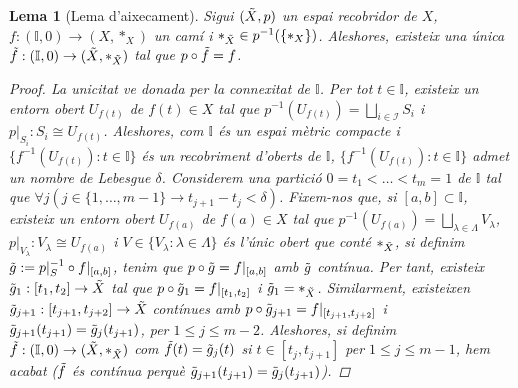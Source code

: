 \documentclass[compress,10pt]{article}
\newtheorem{lema}{Lema}[section]
\theoremstyle{definition}
\begin{document}
\begin{lema}[Lema d'aixecament]
    Sigui $(\Tilde{X},p)$ un espai recobridor de $X$, $f:(\mathbb{I},0)\rightarrow(X,*_{X})$ un camí i $*_{\Tilde{X}}\in p^{-1}(\{*_{X}\})$. Aleshores, existeix una única $\Tilde{f}:(\mathbb{I},0)\rightarrow(\Tilde{X},*_{\Tilde{X}})$ tal que $p\circ\Tilde{f}=f$.
    \begin{center}
    \end{center}
    \begin{proof}
        La unicitat ve donada per la connexitat de $\mathbb{I}$.\newline
        Per tot $t\in\mathbb{I}$, existeix un entorn obert $U_{f(t)}$ de $f(t)\in X$ tal que $p^{-1}(U_{f(t)})=\bigsqcup_{i\in\mathscr{I}}S_{i}$ i $p|_{S_{i}}:S_{i}\cong U_{f(t)}$. Aleshores, com $\mathbb{I}$ és un espai mètric compacte i $\{f^{-1}(U_{f(t)}):t\in\mathbb{I}\}$ és un recobriment d'oberts de $\mathbb{I}$, $\{f^{-1}(U_{f(t)}):t\in\mathbb{I}\}$ admet un nombre de Lebesgue $\delta$. Considerem una partició $0=t_{1}<\ldots<t_{m}=1$ de $\mathbb{I}$ tal que $\forall j(j\in\{1,\ldots,m-1\}\rightarrow t_{j+1}-t_{j}<\delta)$.\newline
        Fixem-nos que, si $[a,b]\subset\mathbb{I}$, existeix un entorn obert $U_{f(a)}$ de $f(a)\in X$ tal que $p^{-1}(U_{f(a)})=\bigsqcup_{\lambda\in\Lambda}V_{\lambda}$, $p|_{V_{\lambda}}:V_{\lambda}\cong U_{f(a)}$ i $V\in\{V_{\lambda}:\lambda\in\Lambda\}$ és l'únic obert que conté $*_{\Tilde{X}}$, si definim $\Tilde{g}:=p|_{S}^{-1}\circ f|_{[a,b]}$, tenim que $p\circ\Tilde{g}=f|_{[a,b]}$ amb $\Tilde{g}$ contínua. Per tant, existeix $\Tilde{g}_{1}:[t_{1},t_{2}]\rightarrow\Tilde{X}$ tal que $p\circ\Tilde{g}_{1}=f|_{[t_{1},t_{2}]}$ i $\Tilde{g}_{1}=*_{\Tilde{X}}$. Similarment, existeixen $\Tilde{g}_{j+1}:[t_{j+1},t_{j+2}]\rightarrow\Tilde{X}$ contínues amb $p\circ\Tilde{g}_{j+1}=f|_{[t_{j+1},t_{j+2}]}$ i $\Tilde{g}_{j+1}(t_{j+1})=\Tilde{g}_{j}(t_{j+1})$, per $1\leq j\leq m-2$. Aleshores, si definim $\Tilde{f}:(\mathbb{I},0)\rightarrow(\Tilde{X},*_{\Tilde{X}})$ com $\Tilde{f}(t)=\Tilde{g}_{j}(t)$ si $t\in[t_{j},t_{j+1}]$ per $1\leq j\leq m-1$, hem acabat ($\Tilde{f}$ és contínua perquè $\Tilde{g}_{j+1}(t_{j+1})=\Tilde{g}_{j}(t_{j+1})$).
    \end{proof}
\end{lema}
\end{document}
